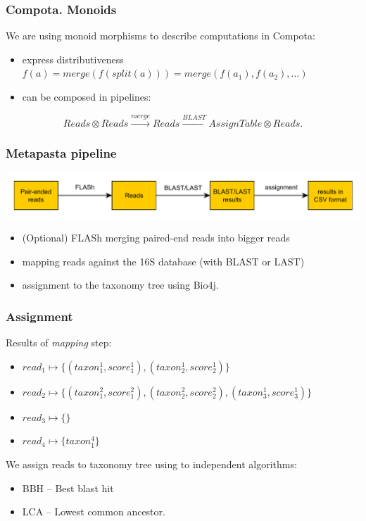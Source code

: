 \documentclass{beamer}
\begin{document}
\begin{frame}
\frametitle{Compota. Monoids}

We are using monoid morphisms to describe computations in Compota:

\begin{itemize}
  \item express distributiveness $f(a) = merge(f(split(a)))= merge(f(a_1), f(a_2), \ldots)$
  \item can be composed in pipelines:
\end{itemize}
$$Reads \otimes Reads \xrightarrow{merge} Reads \xrightarrow{BLAST} AssignTable \otimes Reads.$$



\end{frame}



\begin{frame}
\frametitle{Metapasta pipeline}
\includegraphics[width=\textwidth]{general.pdf}

\begin{itemize}
  \item (Optional) FLASh merging paired-end reads into bigger reads
  \item mapping reads against the 16S database (with BLAST or LAST)
  \item assignment to the taxonomy tree using Bio4j.
\end{itemize}
\end{frame}

\begin{frame}
\frametitle{Assignment}
Results of \textit{mapping} step:
\begin{itemize}
  \item $read_1 \mapsto \{(taxon^1_1, score^1_1), (taxon^1_2, score^1_2)\}$ 
  \item $read_2 \mapsto \{(taxon^2_1, score^2_1), (taxon^2_2, score^2_2), (taxon^1_3, score^1_3)\}$ 
  \item $read_3 \mapsto \{\}$ 
  \item $read_4 \mapsto \{taxon^4_1\}$ 
\end{itemize}
\vspace{1em}
We assign reads to taxonomy tree using to independent algorithms:
\begin{itemize}
  \item BBH -- Best blast hit
  \item LCA -- Lowest common ancestor.
\end{itemize}
 
\end{frame}
\end{document}
